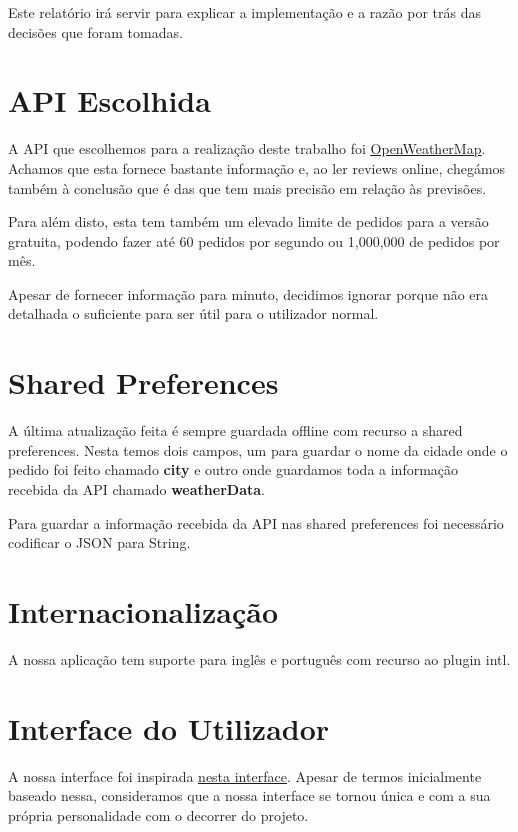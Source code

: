 \documentclass[11pt]{article}
\begin{document}
	Este relatório irá servir para explicar a implementação e a razão por trás das decisões que foram tomadas.
	
	
	\large
	\section{API Escolhida}
	\normalsize
	
	A API que escolhemos para a realização deste trabalho foi \color{blue}\underline{\href{https://openweathermap.org/}{OpenWeatherMap}}\color{black}. Achamos que esta fornece bastante informação e, ao ler reviews online, chegámos também à conclusão que é das que tem mais precisão em relação às previsões.
	
	Para além disto, esta tem também um elevado limite de pedidos para a versão gratuita, podendo fazer até 60 pedidos por segundo ou 1,000,000 de pedidos por mês.
	
	Apesar de fornecer informação para minuto, decidimos ignorar porque não era detalhada o suficiente para ser útil para o utilizador normal.
	
	
	\large
	\section{Shared Preferences}
	\normalsize
	
	A última atualização feita é sempre guardada offline com recurso a shared preferences. Nesta temos dois campos, um para guardar o nome da cidade onde o pedido foi feito chamado \textbf{city} e outro onde guardamos toda a informação recebida da API chamado \textbf{weatherData}.
	
	Para guardar a informação recebida da API nas shared preferences foi necessário codificar o JSON para String.
	
	
	\large
	\section{Internacionalização}
	\normalsize
	
	A nossa aplicação tem suporte para inglês e português com recurso ao plugin intl.
	
	
	\large
	\section{Interface do Utilizador}
	\normalsize
	
	A nossa interface foi inspirada \color{blue}\underline{\href{https://search.muz.li/OThiNGFlMTE2}{nesta interface}}\color{black}. Apesar de termos inicialmente baseado nessa, consideramos que a nossa interface se tornou única e com a sua própria personalidade com o decorrer do projeto.
	
\end{document}
